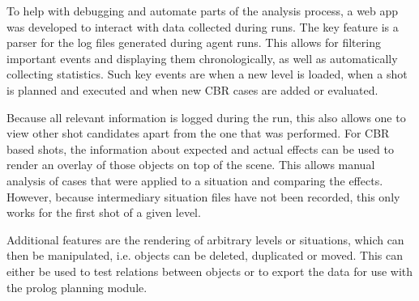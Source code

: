 To help with debugging and automate parts of the analysis process, a web app was developed to interact with data collected during runs.
The key feature is a parser for the log files generated during agent runs. This allows for filtering important events and displaying them chronologically, as well as automatically collecting statistics.
Such key events are when a new level is loaded, when a shot is planned and executed and when new \ac{CBR} cases are added or evaluated.

Because all relevant information is logged during the run, this also allows one to view other shot candidates apart from the one that was performed.
For \ac{CBR} based shots, the information about expected and actual effects can be used to render an overlay of those objects on top of the scene.
This allows manual analysis of cases that were applied to a situation and comparing the effects.
However, because intermediary situation files have not been recorded, this only works for the first shot of a given level.


Additional features are the rendering of arbitrary levels or situations, which can then be manipulated, i.e. objects can be deleted, duplicated or moved.
This can either be used to test relations between objects or to export the data for use with the prolog planning module.
